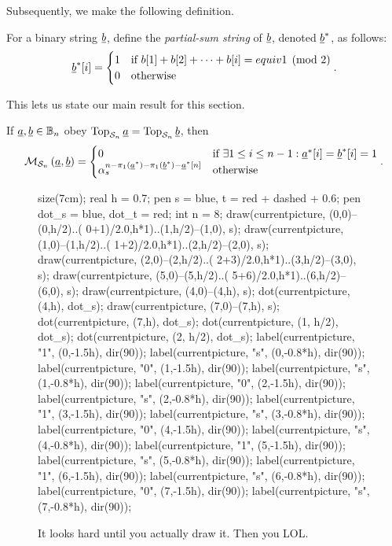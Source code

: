 Subsequently, we make the following definition.
\begin{definition*}
	For a binary string $\underline{b}$, define the \emph{partial-sum string} of $\underline{b}$, denoted $\underline{b}^\ast$, as follows:
	\[
		\underline{b}^\ast [i] = 
		\begin{cases}
			1 & \text{if } b[1] + b[2] + \dots + b[i] = equiv 1 \pmod{2} \\
			0 & \text{otherwise}
		\end{cases}.
	\]
\end{definition*}
This lets us state our main result for this section.
\begin{theorem}
	If $\underline{a}, \underline{b} \in \mathbb B_n$ obey $\operatorname{Top}_{\mathcal S_n} \underline{a} = \operatorname{Top}_{\mathcal S_n} \underline{b}$, then
	\[
		\mathcal M_{\mathcal S_n} \left( \underline{a}, \underline{b} \right)
		=
		\begin{cases}
			0 & \text{if } \exists 1 \le i \le n-1: \underline{a}^\ast[i] = \underline{b}^\ast[i] = 1 \\
			\alpha_s^{n - \pi_1(\underline{a}^\ast) - \pi_1(\underline{b}^\ast) - \underline{a}^\ast[n]} & \text{otherwise}
		\end{cases}.
	\]
\end{theorem}
\begin{figure}[ht]
	\centering
	\begin{asy}
size(7cm);
real h = 0.7;
pen s = blue, t = red + dashed + 0.6;
pen dot_s = blue, dot_t = red;
int n = 8;
draw(currentpicture, (0,0)--(0,h/2)..\left( 0+1)/2.0,h*1)..(1,h/2)--(1,0), s);
draw(currentpicture, (1,0)--(1,h/2)..\left( 1+2)/2.0,h*1)..(2,h/2)--(2,0), s);
draw(currentpicture, (2,0)--(2,h/2)..\left( 2+3)/2.0,h*1)..(3,h/2)--(3,0), s);
draw(currentpicture, (5,0)--(5,h/2)..\left( 5+6)/2.0,h*1)..(6,h/2)--(6,0), s);
draw(currentpicture, (4,0)--(4,h), s);
dot(currentpicture, (4,h), dot_s);
draw(currentpicture, (7,0)--(7,h), s);
dot(currentpicture, (7,h), dot_s);
dot(currentpicture, (1, h/2), dot_s);
dot(currentpicture, (2, h/2), dot_s);
label(currentpicture, "1", (0,-1.5h), dir(90));
label(currentpicture, "s", (0,-0.8*h), dir(90));
label(currentpicture, "0", (1,-1.5h), dir(90));
label(currentpicture, "s", (1,-0.8*h), dir(90));
label(currentpicture, "0", (2,-1.5h), dir(90));
label(currentpicture, "s", (2,-0.8*h), dir(90));
label(currentpicture, "1", (3,-1.5h), dir(90));
label(currentpicture, "s", (3,-0.8*h), dir(90));
label(currentpicture, "0", (4,-1.5h), dir(90));
label(currentpicture, "s", (4,-0.8*h), dir(90));
label(currentpicture, "1", (5,-1.5h), dir(90));
label(currentpicture, "s", (5,-0.8*h), dir(90));
label(currentpicture, "1", (6,-1.5h), dir(90));
label(currentpicture, "s", (6,-0.8*h), dir(90));
label(currentpicture, "0", (7,-1.5h), dir(90));
label(currentpicture, "s", (7,-0.8*h), dir(90));
	\end{asy}
	\caption{It looks hard until you actually draw it.  Then you LOL.}
\end{figure}
